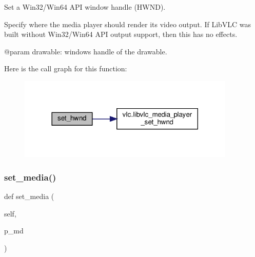\begin{DoxyVerb}Set a Win32/Win64 API window handle (HWND).

Specify where the media player should render its video
output. If LibVLC was built without Win32/Win64 API output
support, then this has no effects.

@param drawable: windows handle of the drawable.
\end{DoxyVerb}
 Here is the call graph for this function\+:
\nopagebreak
\begin{figure}[H]
\begin{center}
\leavevmode
\includegraphics[width=293pt]{classvlc_1_1_media_player_aee1140a71ab519fb1b1d4641272298fe_cgraph}
\end{center}
\end{figure}
\mbox{\label{classvlc_1_1_media_player_a8d4d4151676c2941cdd0cee4e25648c5}} 
\subsubsection{\texorpdfstring{set\+\_\+media()}{set\_media()}}
{\footnotesize\ttfamily def set\+\_\+media (\begin{DoxyParamCaption}\item[{}]{self,  }\item[{}]{p\+\_\+md }\end{DoxyParamCaption})}

